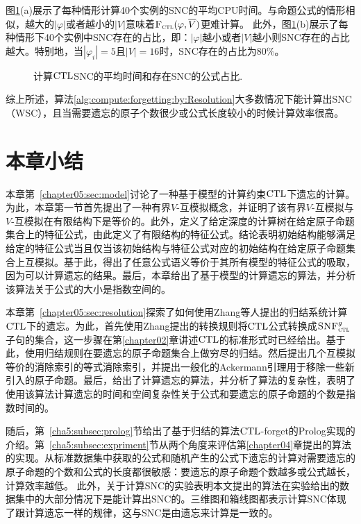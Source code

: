 图\ref{chapter04:fig:CtlTime}(a)展示了每种情形计算40个实例的SNC的平均CPU时间。与命题公式的情形相似，越大的$|\varphi|$或者越小的$|V|$意味着${\textsc{F}_{\textsc{ctl}}}(\varphi, \overline{V})$更难计算。
此外，图\ref{chapter04:fig:CtlTime}(b)展示了每种情形下40个实例中SNC存在的占比，即：$|\varphi|$越小或者$|V|$越小则SNC存在的占比越大。特别地，当$|\varphi_i|=5$且$|V|=16$时，SNC存在的占比为80\%。



\begin{figure*}[!htb]
	\centering
	\caption{计算$\textrm{CTL}$SNC的平均时间和存在SNC的公式占比.}
	\label{chapter04:fig:CtlTime}
\end{figure*}

综上所述，算法\ref{alg:compute:forgetting:by:Resolution}大多数情况下能计算出SNC（WSC），且当需要遗忘的原子个数很少或公式长度较小的时候计算效率很高。


\section{本章小结} 
本章第~\ref{chapter05:sec:model}讨论了一种基于模型的计算约束$\textrm{CTL}$下遗忘的计算。为此，本章第一节首先提出了一种有界$V$-互模拟概念，并证明了该有界$V$-互模拟与$V$-互模拟在有限结构下是等价的。此外，定义了给定深度的计算树在给定原子命题集合上的特征公式，由此定义了有限结构的特征公式。结论表明初始结构能够满足给定的特征公式当且仅当该初始结构与特征公式对应的初始结构在给定原子命题集合上互模拟。基于此，得出了任意公式语义等价于其所有模型的特征公式的吸取，因为可以计算遗忘的结果。最后，本章给出了基于模型的计算遗忘的算法，并分析该算法关于公式的大小是指数空间的。

本章第~\ref{chapter05:sec:resolution}探索了如何使用Zhang等人提出的归结系统计算$\textrm{CTL}$下的遗忘。为此，首先使用Zhang提出的转换规则将$\textrm{CTL}$公式转换成${\textsc{SNF}_{\textsc{ctl}}^g}$子句的集合，这一步骤在第\ref{chapter02}章讲述$\textrm{CTL}$的标准形式时已经给出。基于此，使用归结规则在要遗忘的原子命题集合上做穷尽的归结。然后提出几个互模拟等价的消除索引的等式消除索引，并提出一般化的Ackermann引理用于移除一些新引入的原子命题。最后，给出了计算遗忘的算法，并分析了算法的复杂性，表明了使用该算法计算遗忘的时间和空间复杂性关于公式和要遗忘的原子命题的个数是指数时间的。


随后，第~\ref{cha5:subsec:prolog}节给出了基于归结的算法$\textrm{CTL}$-forget的Prolog实现的介绍。第~\ref{cha5:subsec:expriment}节从两个角度来评估第\ref{chapter04}章提出的算法的实现。从标准数据集中获取的公式和随机产生的公式下遗忘的计算对需要遗忘的原子命题的个数和公式的长度都很敏感：要遗忘的原子命题个数越多或公式越长，计算效率越低。
此外，关于计算SNC的实验表明本文提出的算法在实验给出的数据集中的大部分情况下是能计算出SNC的。三维图和箱线图都表示计算SNC体现了跟计算遗忘一样的规律，这与SNC是由遗忘来计算是一致的。
